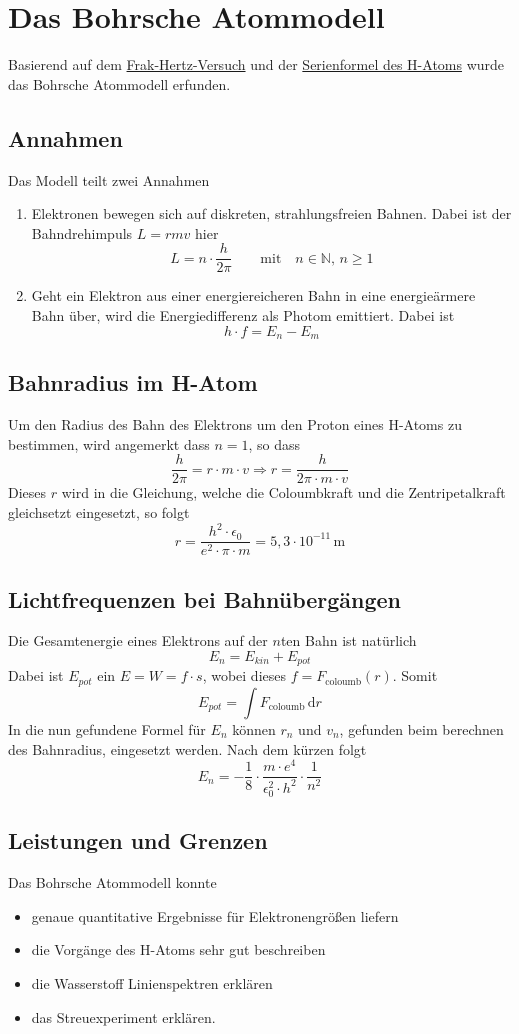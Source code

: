 \documentclass{article}
\begin{document}
\section{Das Bohrsche Atommodell}
Basierend auf dem \hyperref[Der Frank-Hertz-Versuch]{Frak-Hertz-Versuch} und der \hyperref[Das Linienspektrum von Wasserstoffatomen]{Serienformel des H-Atoms} wurde das Bohrsche Atommodell erfunden.
 
\subsection{Annahmen}
Das Modell teilt zwei Annahmen 
\begin{enumerate}
 \item Elektronen bewegen sich auf diskreten, strahlungsfreien Bahnen. Dabei ist der Bahndrehimpuls $L=rmv$ hier
\[
 L = n \cdot \frac{h}{2 \pi}
 \qquad \text{mit} \quad
 n \in \mathbb{N},\,n \ge 1 
\] 
 \item Geht ein Elektron aus einer energiereicheren Bahn in eine energieärmere Bahn über, wird die Energiedifferenz als Photom emittiert. Dabei ist
\[
 h \cdot f = E_n - E_m 
\]  
\end{enumerate} 
 
\subsection{Bahnradius im H-Atom}
Um den Radius des Bahn des Elektrons um den Proton eines H-Atoms zu bestimmen, wird angemerkt dass $n=1$, so dass
\[
 \frac{h}{2\pi} = r \cdot m \cdot v
 \Longrightarrow r = \frac{h}{2\pi \cdot m \cdot v} 
\]
Dieses $r$ wird in die Gleichung, welche die Coloumbkraft und die Zentripetalkraft gleichsetzt eingesetzt, so folgt
\[
 r = \frac{h^2 \cdot \epsilon_0}{e^2 \cdot \pi \cdot m} = 5,3 \cdot 10^{-11}\,\text{m} 
\] 
\subsection{Lichtfrequenzen bei Bahnübergängen}
Die Gesamtenergie eines Elektrons auf der $n$ten Bahn ist natürlich
\[
 E_n = E_{kin} + E_{pot} 
\] 
Dabei ist $E_{pot}$ ein $E=W=f \cdot s$, wobei dieses $f=F_{\text{coloumb}}(r)$. Somit
\[
 E_{pot} = \int F_{\text{coloumb}}\,\text{d}r 
\]
In die nun gefundene Formel für $E_n$ können $r_n$ und $v_n$, gefunden beim berechnen des Bahnradius, eingesetzt werden. Nach dem kürzen folgt
\[
 E_n = -\frac{1}{8} \cdot \frac{m \cdot e^4}{\epsilon_0^2 \cdot h^2} \cdot \frac{1}{n^2} 
\] 
\subsection{Leistungen und Grenzen}
Das Bohrsche Atommodell konnte
\begin{itemize}
 \item genaue quantitative Ergebnisse für Elektronengrößen liefern
 \item die Vorgänge des H-Atoms sehr gut beschreiben
 \item die Wasserstoff Linienspektren erklären
 \item das Streuexperiment erklären.
\end{itemize} 
 
\end{document}

